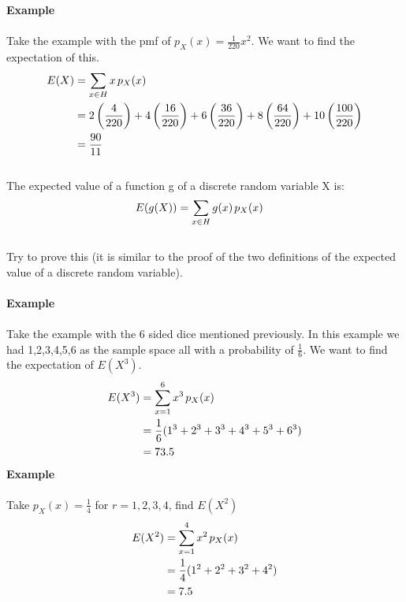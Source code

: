 \documentclass[,oneside]{article}
\begin{document}
\begin{enumerate}
\textbf{Example}\\ \\
Take the example with the pmf of $p_X(x)=\frac{1}{220}x^2$. We want to find the expectation of this. \\
\begin{align*}
E(X) &= \sum\limits_{x \in H} x\hspace{0.05cm}p_X(x)\\
&= 2 \left ( \frac{4}{220}\right ) + 4 \left ( \frac{16}{220}\right ) + 6 \left ( \frac{36}{220}\right ) + 8 \left ( \frac{64}{220}\right ) + 10 \left ( \frac{100}{220}\right )\\
&= \frac{90}{11}\\
\end{align*}\\
The expected value of a function g of a discrete random variable X is:\\
\begin{align*}
E(g(X)) &= \sum\limits_{x \in H} g(x)\hspace{0.05cm}p_X(x)
\end{align*}\\
Try to prove this (it is similar to the proof of the two definitions of the expected value of a discrete random variable).\\ \\
\textbf{Example}\\ \\
Take the example with the 6 sided dice mentioned previously. In this example we had 1,2,3,4,5,6 as the sample space all with a probability of $\frac{1}{6}$. We want to find the expectation of $E(X^3)$.\\
\begin{align*}
E(X^3) &= \sum\limits_{x = 1}^{6} x^3 \hspace{0.05cm}p_X(x)\\
&= \frac{1}{6}(1^3+2^3+3^3+4^3+5^3+6^3)\\
&= 73.5
\end{align*} 
\textbf{Example}\\ \\
Take $p_X(x)=\frac{1}{4}$ for $r = 1, 2, 3, 4$, find $E(X^2)$\\
\begin{align*}
E(X^2) &= \sum\limits_{x = 1}^{4} x^2 \hspace{0.05cm}p_X(x)\\
&= \frac{1}{4}(1^2+2^2+3^2+4^2)\\
&= 7.5
\end{align*} \\

\end{enumerate}
\end{document}
